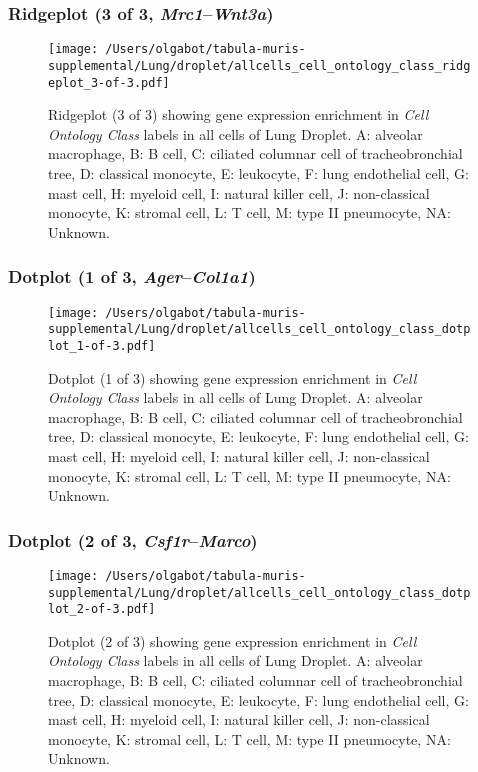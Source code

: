 \clearpage

\subsubsection{Ridgeplot (3 of 3, \emph{Mrc1}--\emph{Wnt3a})}
\begin{figure}[h]
\centering
\texttt{[image: /Users/olgabot/tabula-muris-supplemental/Lung/droplet/allcells\_cell\_ontology\_class\_ridgeplot\_3-of-3.pdf]}

\caption{ Ridgeplot (3 of 3)  showing gene expression enrichment in \emph{Cell Ontology Class} labels in all cells of Lung Droplet. A: alveolar macrophage, B: B cell, C: ciliated columnar cell of tracheobronchial tree, D: classical monocyte, E: leukocyte, F: lung endothelial cell, G: mast cell, H: myeloid cell, I: natural killer cell, J: non-classical monocyte, K: stromal cell, L: T cell, M: type II pneumocyte, NA: Unknown.}
\end{figure}


\clearpage

\subsubsection{Dotplot (1 of 3, \emph{Ager}--\emph{Col1a1})}
\begin{figure}[h]
\centering
\texttt{[image: /Users/olgabot/tabula-muris-supplemental/Lung/droplet/allcells\_cell\_ontology\_class\_dotplot\_1-of-3.pdf]}

\caption{ Dotplot (1 of 3)  showing gene expression enrichment in \emph{Cell Ontology Class} labels in all cells of Lung Droplet. A: alveolar macrophage, B: B cell, C: ciliated columnar cell of tracheobronchial tree, D: classical monocyte, E: leukocyte, F: lung endothelial cell, G: mast cell, H: myeloid cell, I: natural killer cell, J: non-classical monocyte, K: stromal cell, L: T cell, M: type II pneumocyte, NA: Unknown.}
\end{figure}


\clearpage

\subsubsection{Dotplot (2 of 3, \emph{Csf1r}--\emph{Marco})}
\begin{figure}[h]
\centering
\texttt{[image: /Users/olgabot/tabula-muris-supplemental/Lung/droplet/allcells\_cell\_ontology\_class\_dotplot\_2-of-3.pdf]}

\caption{ Dotplot (2 of 3)  showing gene expression enrichment in \emph{Cell Ontology Class} labels in all cells of Lung Droplet. A: alveolar macrophage, B: B cell, C: ciliated columnar cell of tracheobronchial tree, D: classical monocyte, E: leukocyte, F: lung endothelial cell, G: mast cell, H: myeloid cell, I: natural killer cell, J: non-classical monocyte, K: stromal cell, L: T cell, M: type II pneumocyte, NA: Unknown.}
\end{figure}


